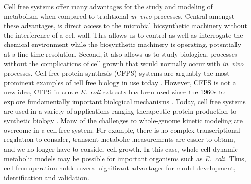 \documentclass[12pt]{article}
\begin{document}
Cell free systems offer many advantages for the study and modeling of metabolism when compared to traditional \textit{in~vivo} processes.
Central amongst these advantages, is direct access to the microbial biosynthetic machinery without the interference of a cell wall. 
This allows us to control as well as interrogate the chemical environment while the biosynthetic machinery is operating, potentially at a fine time resolution.
Second, it also allows us to study biological processes without the complications of cell growth that would normally occur with \textit{in~vivo} processes.
Cell free protein synthesis (CFPS) systems are arguably the most prominent examples of cell free biology in use today \citep{Jewett:2008aa}.
However, CFPS is not a new idea; CFPS in crude \emph{E.~coli} extracts has been used since the 1960s to explore fundamentally important biological mechanisms \citep{MATTHAEI:1961aa,NIRENBERG:1961aa}. 
Today, cell free systems are used in a variety of applications ranging therapeutic protein production \citep{Lu:2014aa} to synthetic biology \citep{Hodgman:2012aa}. 
Many of the challenges to whole-genome kinetic modeling are overcome in a cell-free system. 
For example, there is no complex transcriptional regulation to consider, transient metabolic measurements are easier to obtain, and we no longer have to consider cell growth. 
In this case, whole cell dynamic metabolic models may be possible for important organisms such as \emph{E.~coli.} 
Thus, cell-free operation holds several significant advantages for model development, identification and validation.
\end{document}
